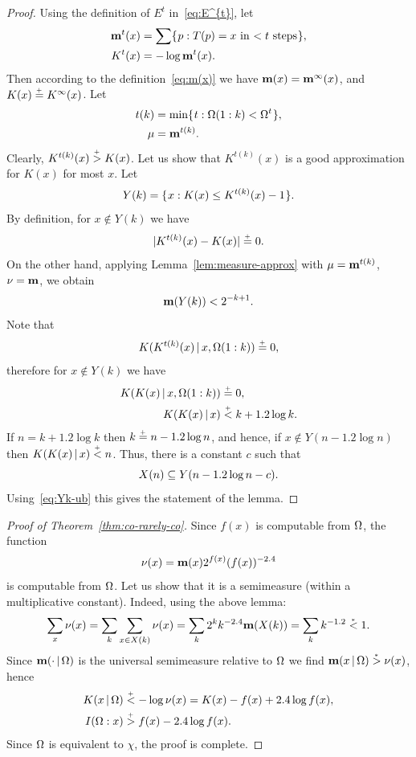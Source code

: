  \begin{proof}
  \leanok
Using the definition of \( E^{t} \) in~\eqref{eq:E^{t}}, let
\begin{align*}
      \mathbf{m}^{t}(x) &= \sum\mathopen\{\mskip 1mu p : T(p) = x \text{ in \( < t \) steps} \mskip 1mu\mathclose\},
\\    K^{t}(x)  &= -\log \mathbf{m}^{t}(x).
\end{align*}
Then according to the definition~\eqref{eq:m(x)} we have
\( \mathbf{m}(x) = \mathbf{m}^{\infty}(x) \), and \( K(x) \stackrel{{}_+}{=} K^{\infty}(x) \).
Let
 \begin{align*}
     t(k) &= \min\mathopen\{\mskip 1mu t : \Omega(1 : k) < \Omega^{t}\mskip 1mu\mathclose\},
\\ \mu    &= \mathbf{m}^{t(k)}.
 \end{align*}
Clearly, \( K^{t(k)}(x) \stackrel{{}_+}{>} K(x) \).
Let us show that \( K^{t(k)}(x) \)
is a good approximation for \( K(x) \) for most \( x \).
Let
 \[
   Y(k) = \mathopen\{\mskip 1mu x : K(x) \le K^{t(k)}(x) - 1\mskip 1mu\mathclose\}.
 \]
By definition, for \( x \notin Y(k) \) we have
 \[
   |K^{t(k)}(x) - K(x)| \stackrel{{}_+}{=} 0.
 \]
On the other hand, applying Lemma~\ref{lem:measure-approx} with
\( \mu = \mathbf{m}^{t(k)} \), \( \nu = \mathbf{m} \), we obtain
 \begin{equation}\label{eq:Yk-ub}
   \mathbf{m}(Y(k)) < 2^{-k + 1}.
 \end{equation}
Note that
 \[
   K(K^{t(k)}(x) \,\vert\, x, \Omega(1 : k)) \stackrel{{}_+}{=} 0,
 \]
therefore for \( x \notin Y(k) \) we have
 \begin{align*}
  K(K(x) \,\vert\, x, \Omega(1 : k)) &\stackrel{{}_+}{=} 0,
\\   K(K(x) \,\vert\, x) &\stackrel{{}_+}{<} k + 1.2 \log k.
 \end{align*}
If \( n = k + 1.2\log k \) then \( k \stackrel{{}_+}{=} n - 1.2\log n \), and hence,
if \( x \notin Y(n - 1.2\log n) \) then \( K(K(x) \,\vert\, x) \stackrel{{}_+}{<} n \).
Thus, there is a constant \( c \) such that
 \[
   X(n) \subseteq Y(n - 1.2\log n - c).
 \]
Using~\eqref{eq:Yk-ub} this gives the statement of the lemma.
 \end{proof}

 \begin{proof}[Proof of Theorem~\protect\ref{thm:co-rarely-co}]
  \leanok
Since \( f(x) \) is computable from \( \Omega \), the function
 \[
   \nu(x) = \mathbf{m}(x)2^{f(x)}(f(x))^{-2.4}
 \]
is computable from \( \Omega \).
Let us show that it is a semimeasure (within a multiplicative constant).
Indeed, using the above lemma:
 \[
   \sum_{x} \nu(x) = \sum_{k} \sum_{x \in X(k)} \nu(x)
                 = \sum_{k} 2^{k} k^{-2.4} \mathbf{m}(X(k))
                 = \sum_{k} k^{-1.2} \stackrel{{}_*}{<} 1.
 \]
Since \( \mathbf{m}(\cdot \,\vert\, \Omega) \) is the universal semimeasure relative to \( \Omega \)
we find \( \mathbf{m}(x \,\vert\, \Omega) \stackrel{{}_*}{>} \nu(x) \), hence
 \begin{align*}
   K(x \,\vert\, \Omega) &\stackrel{{}_+}{<} -\log \nu(x) = K(x) - f(x) + 2.4\log f(x),
\\    I(\Omega : x) &\stackrel{{}_+}{>} f(x) - 2.4 \log f(x).
 \end{align*}
Since \( \Omega \) is equivalent to \( \chi \), the proof is complete.
  \end{proof}

